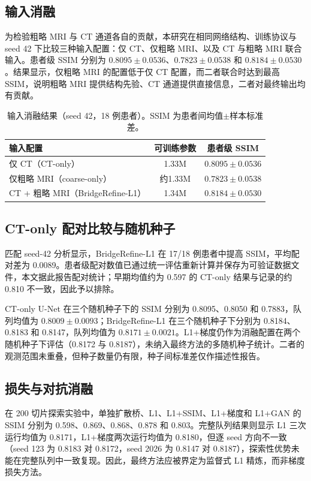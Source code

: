 \documentclass[UTF8,12pt,a4paper,twocolumn]{ctexart}
\begin{document}
\subsection{输入消融}
为检验粗略 MRI 与 CT 通道各自的贡献，本研究在相同网络结构、训练协议与 seed 42 下比较三种输入配置：仅 CT、仅粗略 MRI、以及 CT 与粗略 MRI 联合输入。患者级 SSIM 分别为 $0.8095\pm0.0536$、$0.7823\pm0.0538$ 和 $0.8184\pm0.0530$。结果显示，仅粗略 MRI 的配置低于仅 CT 配置，而二者联合时达到最高 SSIM，说明粗略 MRI 提供结构先验、CT 通道提供直接信息，二者对最终输出均有贡献。

\begin{table}[!t]\centering\small
\caption{输入消融结果（seed 42，18 例患者）。SSIM 为患者间均值$\pm$样本标准差。}
\begin{tabular}{lcc}\toprule
输入配置 & 可训练参数 & 患者级 SSIM\\\midrule
仅 CT（CT-only）&1.33M&$0.8095\pm0.0536$\\
仅粗略 MRI（coarse-only）&约1.33M&$0.7823\pm0.0538$\\
CT + 粗略 MRI（BridgeRefine-L1）&1.34M&$0.8184\pm0.0530$\\\bottomrule
\end{tabular}\label{tab:input_ablation}
\end{table}

\subsection{CT-only 配对比较与随机种子}
匹配 seed-42 分析显示，BridgeRefine-L1 在 17/18 例患者中提高 SSIM，平均配对差为 0.0089。患者级配对数值已通过统一评估重新计算并保存为可验证数据文件，本文据此报告配对统计；早期均值约为 0.597 的 CT-only 结果与记录的约 0.810 不一致，因此予以排除。

CT-only U-Net 在三个随机种子下的 SSIM 分别为 0.8095、0.8050 和 0.7883，队列均值为 $0.8009\pm0.0093$；BridgeRefine-L1 在三个随机种子下分别为 0.8184、0.8183 和 0.8147，队列均值为 $0.8171\pm0.0021$。L1+梯度仍作为消融配置在两个随机种子下评估（0.8172 与 0.8187），未纳入最终方法的多随机种子统计。二者的观测范围未重叠，但种子数量仍有限，种子间标准差仅作描述性报告。

\subsection{损失与对抗消融}
在 200 切片探索实验中，单独扩散桥、L1、L1+SSIM、L1+梯度和 L1+GAN 的 SSIM 分别为 0.598、0.869、0.868、0.878 和 0.803。完整队列结果则显示 L1 三次运行均值为 0.8171，L1+梯度两次运行均值为 0.8180，但逐 seed 方向不一致（seed 123 为 0.8183 对 0.8172，seed 2026 为 0.8147 对 0.8187），探索性优势未能在完整队列中一致复现。因此，最终方法应被界定为监督式 L1 精炼，而非梯度损失方法。
\end{document}
